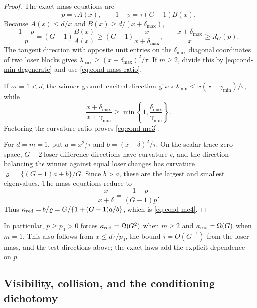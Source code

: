 \begin{proof}
The exact mass equations are
\begin{equation}
 p=\tau A(x),\qquad 1-p=\tau(G-1)B(x).                    \label{eq:cond-mass-equations}
\end{equation}
Because $A(x)\le d/x$ and $B(x)\ge d/(x+\delta_{\max})$,
\begin{equation}
 \frac{1-p}{p}=(G-1)\frac{B(x)}{A(x)}
 \ge(G-1)\frac{x}{x+\delta_{\max}},
 \qquad \frac{x+\delta_{\max}}x\ge R_G(p).              \label{eq:cond-mass-ratio}
\end{equation}
The tangent direction with opposite unit entries on the $\delta_{\max}$
diagonal coordinates of two loser blocks gives
$\lambda_{\max}\ge(x+\delta_{\max})^2/\tau$.  If $m\ge2$, divide this
by \eqref{eq:cond-min-degenerate} and use
\eqref{eq:cond-mass-ratio}.

If $m=1<d$, the winner ground--excited direction gives
$\lambda_{\min}\le x(x+\gamma_{\min})/\tau$, while
\[
 \frac{x+\delta_{\max}}{x+\gamma_{\min}}
 \ge\min\left\{1,\frac{\delta_{\max}}{\gamma_{\min}}\right\}.
\]
Factoring the curvature ratio proves \eqref{eq:cond-mc3}.

For $d=m=1$, put $a=x^2/\tau$ and $b=(x+\delta)^2/\tau$.  On the scalar
trace-zero space, $G-2$ loser-difference directions have curvature $b$, and
the direction balancing the winner against equal loser changes has curvature
$\varrho=\{(G-1)a+b\}/G$.  Since $b>a$, these are the largest and smallest
eigenvalues.  The mass equations reduce to
\[
 \frac{x}{x+\delta}=\frac{1-p}{(G-1)p}.
\]
Thus $\kappa_{\rm red}=b/\varrho=G/\{1+(G-1)a/b\}$, which is
\eqref{eq:cond-mc4}.
\end{proof}

In particular, $p\ge p_0>0$ forces $\kappa_{\rm red}=\Omega(G^2)$ when
$m\ge2$ and $\kappa_{\rm red}=\Omega(G)$ when $m=1$.  This also follows from
$x\le d\tau/p_0$, the bound $\tau=O(G^{-1})$ from the loser mass, and the
test directions above; the exact laws add the explicit dependence on $p$.

\subsection{Visibility, collision, and the conditioning dichotomy}
\label{sec:condensation-visibility}

